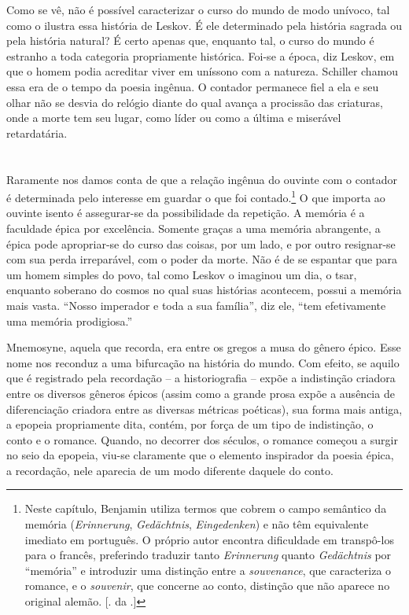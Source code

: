 Como se vê, não é possível caracterizar o curso do mundo de modo
unívoco, tal como o ilustra essa história de Leskov. É ele determinado
pela história sagrada ou pela história natural? É certo apenas que,
enquanto tal, o curso do mundo é estranho a toda categoria propriamente
histórica. Foi-se a época, diz Leskov, em que o homem podia acreditar
viver em uníssono com a natureza. Schiller chamou essa era de o tempo da
poesia ingênua. O contador permanece fiel a ela e seu olhar não se
desvia do relógio diante do qual avança a procissão das criaturas, onde
a morte tem seu lugar, como líder ou como a última e miserável retardatária.

\section{}

Raramente nos damos conta de que a relação ingênua do ouvinte com o
contador é determinada pelo interesse em guardar o que foi contado.\footnote{Neste capítulo, Benjamin utiliza termos que cobrem o campo
  semântico da memória (\emph{Erinnerung}, \emph{Gedächtnis},
  \emph{Eingedenken}) e não têm equivalente imediato em português. O
  próprio autor encontra dificuldade em transpô-los para o francês,
  preferindo traduzir tanto \emph{Erinnerung} quanto \emph{Gedächtnis}
  por ``memória'' e introduzir uma distinção entre a \emph{souvenance},
  que caracteriza o romance, e o \emph{souvenir}, que concerne ao conto,
  distinção que não aparece no original alemão. [. da .]} O
que importa ao ouvinte isento é assegurar-se da possibilidade da
repetição. A memória é a faculdade épica por excelência. Somente graças
a uma memória abrangente, a épica pode apropriar-se do curso das coisas,
por um lado, e por outro resignar-se com sua perda irreparável, com o
poder da morte. Não é de se espantar que para um homem simples do povo,
tal como Leskov o imaginou um dia, o tsar, enquanto soberano do cosmos
no qual suas histórias acontecem, possui a memória mais vasta. ``Nosso
imperador e toda a sua família'', diz ele, ``tem efetivamente uma memória
prodigiosa.''

Mnemosyne, aquela que recorda, era entre os gregos a musa do gênero
épico. Esse nome nos reconduz a uma bifurcação na história do mundo. Com
efeito, se aquilo que é registrado pela recordação -- a historiografia
-- expõe a indistinção criadora entre os diversos gêneros épicos (assim
como a grande prosa expõe a ausência de diferenciação criadora entre as
diversas métricas poéticas), sua forma mais antiga, a epopeia
propriamente dita, contém, por força de um tipo de indistinção, o conto
e o romance. Quando, no decorrer dos séculos, o romance começou a surgir
no seio da epopeia, viu-se claramente que o elemento inspirador da
poesia épica, a recordação, nele aparecia de um modo diferente daquele
do conto.


